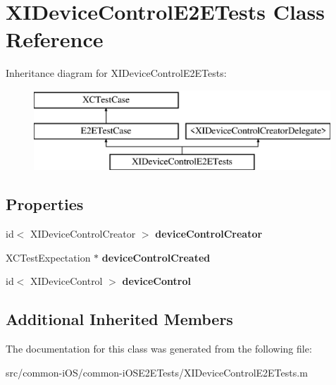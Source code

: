 \hypertarget{interface_x_i_device_control_e2_e_tests}{}\section{X\+I\+Device\+Control\+E2\+E\+Tests Class Reference}
\label{interface_x_i_device_control_e2_e_tests}
Inheritance diagram for X\+I\+Device\+Control\+E2\+E\+Tests\+:\begin{figure}[H]
\begin{center}
\leavevmode
\includegraphics[height=3.000000cm]{interface_x_i_device_control_e2_e_tests}
\end{center}
\end{figure}
\subsection*{Properties}
\begin{DoxyCompactItemize}
\item 
\hypertarget{interface_x_i_device_control_e2_e_tests_a8f76a13957cf132c501aabb38d9cd098}{}\label{interface_x_i_device_control_e2_e_tests_a8f76a13957cf132c501aabb38d9cd098} 
id$<$ X\+I\+Device\+Control\+Creator $>$ {\bfseries device\+Control\+Creator}
\item 
\hypertarget{interface_x_i_device_control_e2_e_tests_a287c84f6e10c9002cd77d652c48036d7}{}\label{interface_x_i_device_control_e2_e_tests_a287c84f6e10c9002cd77d652c48036d7} 
X\+C\+Test\+Expectation $\ast$ {\bfseries device\+Control\+Created}
\item 
\hypertarget{interface_x_i_device_control_e2_e_tests_a458c4eaf0d9b216f8a132b71b0d271a5}{}\label{interface_x_i_device_control_e2_e_tests_a458c4eaf0d9b216f8a132b71b0d271a5} 
id$<$ X\+I\+Device\+Control $>$ {\bfseries device\+Control}
\end{DoxyCompactItemize}
\subsection*{Additional Inherited Members}


The documentation for this class was generated from the following file\+:\begin{DoxyCompactItemize}
\item 
src/common-\/i\+O\+S/common-\/i\+O\+S\+E2\+E\+Tests/X\+I\+Device\+Control\+E2\+E\+Tests.\+m\end{DoxyCompactItemize}
